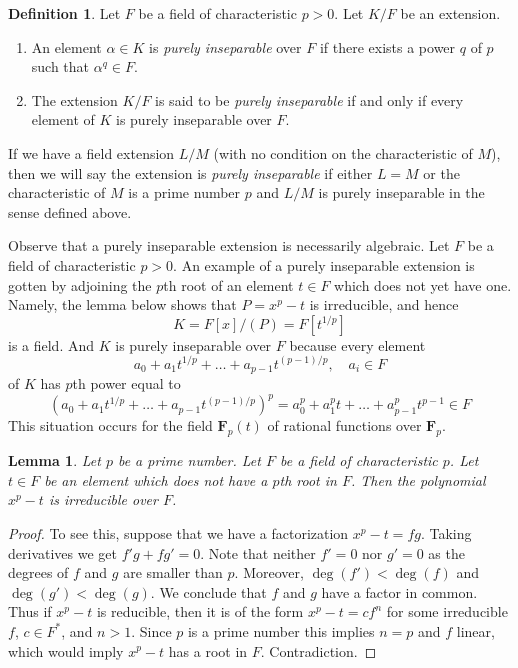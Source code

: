 \documentclass{stacks-project}
\theoremstyle{plain}
\newtheorem{lemma}[subsection]{Lemma}
\theoremstyle{definition}
\newtheorem{definition}[subsection]{Definition}
\theoremstyle{remark}
\numberwithin{equation}{subsection}
\begin{document}
\begin{definition}
\label{definition-purely-inseparable}
Let $F$ be a field of characteristic $p > 0$. Let $K/F$ be an extension.
\begin{enumerate}
\item An element $\alpha \in K$ is {\it purely inseparable} over $F$
if there exists a power $q$ of $p$ such that $\alpha^q \in F$.
\item The extension $K/F$ is said to be {\it purely inseparable}
if and only if every element of $K$ is purely inseparable over $F$.
\end{enumerate}
If we have a field extension $L/M$ (with no condition on the characteristic
of $M$), then we will say the extension is {\it purely inseparable}
if either $L = M$ or the characteristic of $M$ is a prime number $p$
and $L/M$ is purely inseparable in the sense defined above.
\end{definition}

\noindent
Observe that a purely inseparable extension is necessarily algebraic.
Let $F$ be a field of characteristic $p > 0$.
An example of a purely inseparable extension is gotten by adjoining
the $p$th root of an element $t \in F$ which does not yet have one. Namely,
the lemma below shows that $P = x^p - t$ is irreducible, and hence
$$
K = F[x]/(P) = F[t^{1/p}]
$$
is a field. And $K$ is purely inseparable over $F$ because every element
$$
a_0 + a_1t^{1/p} + \ldots + a_{p - 1}t^{(p - 1)/p},\quad a_i \in F
$$
of $K$ has $p$th power equal to
$$
(a_0 + a_1t^{1/p} + \ldots + a_{p - 1}t^{(p - 1)/p})^p =
a_0^p + a_1^p t + \ldots + a_{p - 1}^pt^{p - 1} \in F
$$
This situation occurs for the field
$\mathbf{F}_p(t)$ of rational functions over $\mathbf{F}_p$.

\begin{lemma}
\label{lemma-take-pth-root}
Let $p$ be a prime number. Let $F$ be a field of characteristic $p$.
Let $t \in F$ be an element which does not have a $p$th root in $F$.
Then the polynomial $x^p - t$ is irreducible over $F$.
\end{lemma}

\begin{proof}
To see this, suppose that we have a factorization
$x^p - t = f g$. Taking derivatives we get $f' g + f g' = 0$.
Note that neither $f' = 0$ nor $g' = 0$ as the degrees of $f$ and $g$
are smaller than $p$. Moreover, $\deg(f') < \deg(f)$ and $\deg(g') < \deg(g)$.
We conclude that $f$ and $g$ have a factor in common. Thus if $x^p - t$
is reducible, then it is of the form $x^p - t = c f^n$ for some irreducible
$f$, $c \in F^*$, and $n > 1$. Since $p$ is a prime number this
implies $n = p$ and $f$ linear, which would imply $x^p - t$ has a root
in $F$. Contradiction.
\end{proof}
\end{document}
